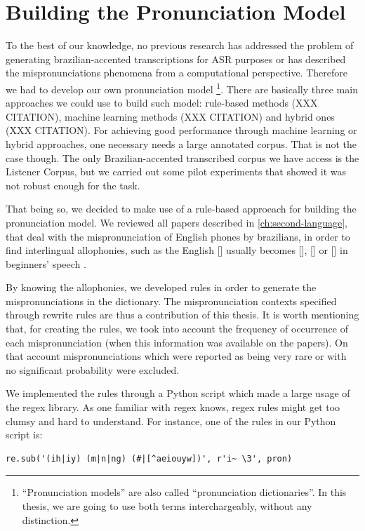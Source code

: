\clearpage
\section{Building the Pronunciation Model}

To the best of our knowledge, no previous research has addressed the problem of generating brazilian-accented 
transcriptions for \ac{ASR} purposes or has described the mispronunciations phenomena from a computational perspective. 
Therefore we had to develop our own pronunciation model
\footnote{``Pronunciation models'' are also called ``pronunciation dictionaries''. In this thesis, we are going to
use both terms interchargeably, without any distinction.}. There are basically 
three main approaches we could use to build such model: rule-based methods (XXX CITATION), machine learning methods (XXX CITATION)
and hybrid ones (XXX CITATION). For achieving good performance through machine learning or hybrid approaches, one necessary 
needs a large annotated corpus. That is not the case though. The only Brazilian-accented transcribed corpus we have access
is the Listener Corpus, but we carried out some pilot experiments that showed it was not robust enough for the task.

That being so, we decided to make use of a rule-based approeach for building the pronunciation model. We reviewed all papers 
described in \autoref{ch:second-language}, that deal with the mispronunciation of English phones by brazilians, in order to find 
interlingual allophonies, such as the English [] usually becomes [], [] or [] in 
beginners' speech \citep{Reis2006}. 

By knowing the allophonies, we developed rules in order to generate the mispronunciations in the dictionary. The mispronunciation contexts
specified through rewrite rules are thus a contribution of this thesis. It is worth mentioning that, for creating the rules, we
took into account the frequency of occurrence of each mispronunciation (when this information was available 
on the papers). On that account mispronunciations which were reported as being very rare or with no significant probability were excluded.

We implemented the rules through a Python script which made a large usage of the \ac{regex} library. As one familiar 
with \ac{regex} knows, \ac{regex} rules might get too clumsy and hard to understand. For instance, one of the rules in our Python script is:

\begin{lstlisting}[float=!h,caption=Example of a fully-specified regex rule.]
re.sub('(ih|iy) (m|n|ng) (#|[^aeiouyw])', r'i~ \3', pron)
\end{lstlisting}

